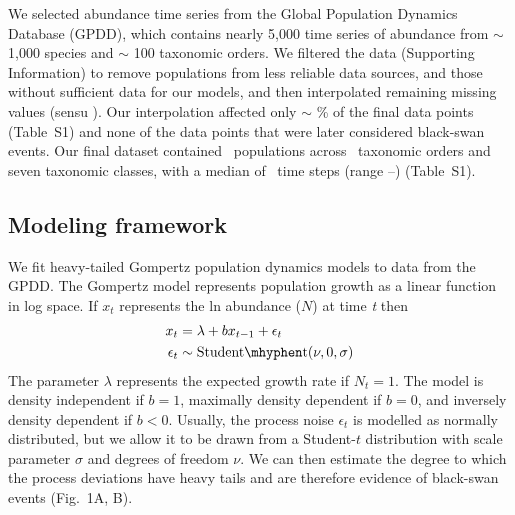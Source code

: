 We selected abundance time series from the Global Population Dynamics
Database \citep{gpdd2010} (GPDD), which contains nearly 5,000 time series of
abundance from \(\sim\) 1,000 species and \(\sim\) 100 taxonomic orders. We
filtered the data (Supporting Information) to remove populations from less
reliable data sources, and those without sufficient data for our models, and
then interpolated remaining missing values (sensu \citet{brook2006a}).
Our interpolation affected only \(\sim\)
\interpPointsPerc \% of the final data points (Table~S1) and none of the data
points that were later considered black-swan events. Our final dataset
contained \NPops\ populations across \NOrders\ taxonomic orders and seven
taxonomic classes, with a median of \medianTimeSteps\ time steps (range
\minTimeSteps--\maxTimeSteps) (Table~S1).

\subsection{Modeling framework}

We fit heavy-tailed Gompertz population dynamics models to data from the GPDD. The Gompertz model represents population growth as a linear function in log space. If \(x_{t}\) represents the ln abundance (\(N\)) at time \emph{t} then
\begin{align}
x_t &= \lambda + bx_{t - 1} + \epsilon_t\\
\epsilon_t &\sim \mathrm{Student\mhyphen t}(\nu, 0, \sigma)
\end{align}
The parameter \(\lambda\) represents the expected growth rate if \(N_{t}
= 1\). The model is density independent if \(b = 1\), maximally density
dependent if \(b = 0\), and inversely density dependent if \(b < 0\). Usually,
the process noise \(\epsilon_{t}\) is modelled as normally distributed, but we
allow it to be drawn from a Student-$t$ distribution with scale parameter
\(\sigma\) and degrees of freedom \(\nu\). We can then estimate the degree to
which the process deviations have heavy tails and are therefore evidence of
black-swan events (Fig.~1A, B).

